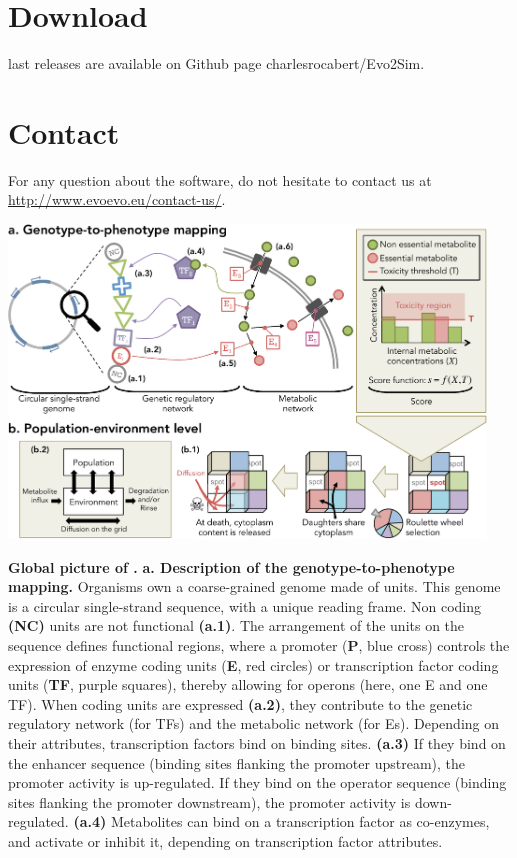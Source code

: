 \section{Download}
{\packageName} last releases are available on Github page charlesrocabert/Evo2Sim.

\section{Contact}
For any question about the software, do not hesitate to contact us at\\ \href{http://www.evoevo.eu/contact-us/}{http://www.evoevo.eu/contact-us/}.

\newpage
\thispagestyle{empty}

\begin{figurehere}
\centering 
\includegraphics[width=0.95\textwidth]{figures/general_algorithm.pdf}
\caption[Global picture of {\packageName}.]{\small{\textbf{Global picture of {\packageName}.} \textbf{a. Description of the genotype-to-phenotype mapping.} Organisms own a coarse-grained genome made of units. This genome is a circular single-strand sequence, with a unique reading frame. Non coding \textbf{(NC)} units are not functional \textbf{(a.1)}. The arrangement of the units on the sequence defines functional regions, where a promoter (\textbf{P}, blue cross) controls the expression of enzyme coding units (\textbf{E}, red circles) or transcription factor coding units (\textbf{TF}, purple squares), thereby allowing for operons (here, one E and one TF). When coding units are expressed \textbf{(a.2)}, they contribute to the genetic regulatory network (for TFs) and the metabolic network (for Es).
Depending on their attributes, transcription factors bind on binding sites. \textbf{(a.3)} If they bind on the enhancer sequence (binding sites flanking the promoter upstream), the promoter activity is up-regulated. If they bind on the operator sequence (binding sites flanking the promoter downstream), the promoter activity is down-regulated. \textbf{(a.4)} Metabolites can bind on a transcription factor as co-enzymes, and activate or inhibit it, depending on transcription factor attributes.
}}
\end{figurehere}
